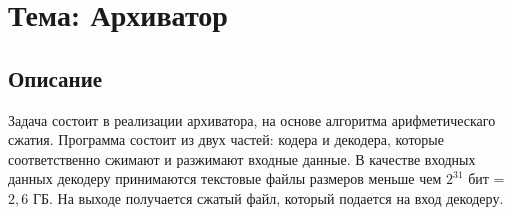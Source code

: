 
\section*{Тема: Архиватор}

\subsection*{Описание}
Задача состоит в реализации архиватора, на основе алгоритма
арифметическаго сжатия. Программа состоит из двух частей: кодера и
декодера, которые соответственно сжимают и разжимают входные данные.
В качестве входных данных декодеру принимаются текстовые
файлы размеров меньше чем $2^{31}$ бит = $2{,}6$ ГБ.
На выходе получается сжатый файл, который подается на вход декодеру.

\pagebreak